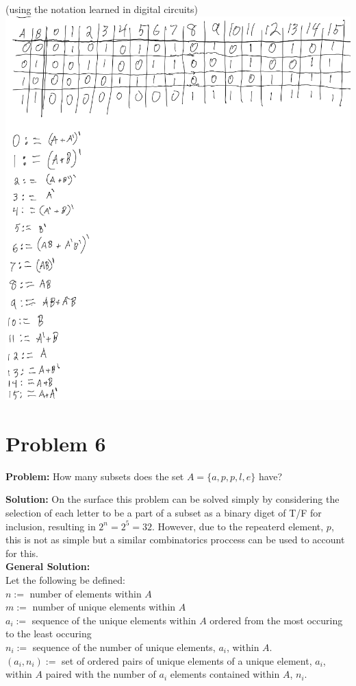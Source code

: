 \documentclass[]{article}
\begin{document}
\newpage
(using the notation learned in digital circuits)\\
\includegraphics[width=\textwidth]{fig/pblm5_op2all_soln.png}


\newpage
\section{Problem 6}
\textbf{Problem:}
How many subsets does the set $A = \{a,p,p,l,e\}$ have?

\textbf{Solution:}
On the surface this problem can be solved simply by considering the selection of
each letter to be a part of a subset as a binary diget of T/F for inclusion,
resulting in $2^n = 2^5 = 32$.
However, due to the repeaterd element, $p$, this is not as simple but a similar
combinatorics proccess can be used to account for this.\\

\textbf{General Solution:}\\
Let the following be defined:\\
$n :=$ number of elements within $A$\\
$m :=$ number of unique elements within $A$\\
${a_i} :=$ sequence of the unique elements within $A$ ordered from 
the most occuring to the least occuring\\
${n_i} :=$ sequence of the number of unique elements, $a_i$, within $A$.\\
${(a_i,n_i)} := $ set of ordered pairs of unique elements of a unique
element, $a_i$, within $A$ paired with the number of $a_i$ elements contained
within $A$, $n_i$.\\
\end{document}

